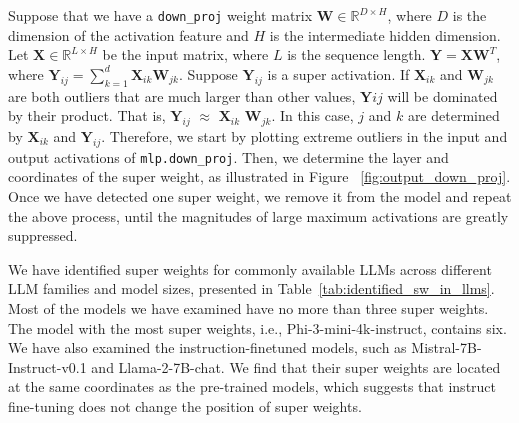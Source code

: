 \documentclass{article} %
\begin{document}
Suppose that we have a \texttt{down\_proj} weight matrix \( \mathbf{W} \in \mathbb{R}^{D \times H} \), where \( D \) is the dimension of the activation feature and \( H \) is the intermediate hidden dimension. Let \( \mathbf{X} \in \mathbb{R}^{L \times H} \) be the input matrix, where \( L \) is the sequence length.
 \( \mathbf{Y} = \mathbf{X}\mathbf{W}^T \), where \( \mathbf{Y}_{ij} = \sum_{k=1}^{d} \mathbf{X}_{ik} \mathbf{W}_{jk} \). Suppose $\mathbf{Y}_{ij}$ is a super activation. If \( \mathbf{X}_{ik}\) and \(\mathbf{W}_{jk} \) are both outliers that are much larger than other values, $\mathbf{Y}{ij}$ will be dominated by their product. That is, $\mathbf{Y}_{ij}$ $\approx$ $\mathbf{X}_{ik}$ $\mathbf{W}_{jk}$. In this case, $j$ and $k$ are determined by $\mathbf{X}_{ik}$ and $\mathbf{Y}_{ij}$. Therefore, we start by plotting extreme outliers in the input and output activations of \texttt{mlp.down\_proj}.  Then, we determine the layer and coordinates of the super weight, as illustrated in Figure~ \ref{fig:output_down_proj}. Once we have detected one super weight, we remove it from the model and repeat the above process, until the magnitudes of large maximum activations are greatly suppressed.

We have identified super weights for commonly available LLMs across different LLM families and model sizes, presented in Table~\ref{tab:identified_sw_in_llms}. Most of the models we have examined have no more than three super weights. 
The model with the most super weights, i.e., Phi-3-mini-4k-instruct, contains six. 
We have also examined the instruction-finetuned models, such as Mistral-7B-Instruct-v0.1 and Llama-2-7B-chat. We find that their super weights are located at the same coordinates as the pre-trained models, which suggests that instruct fine-tuning does not change the position of super weights.
\end{document}
